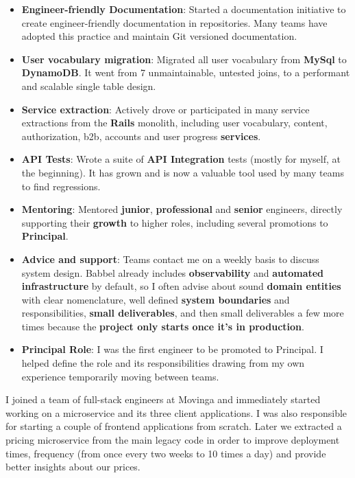 \documentclass[10pt,a4paper,ragged2e,withhyper]{altacv}
\begin{document}
\begin{paracol}{2}
{\begin{itemize}
\item \textbf{Engineer-friendly Documentation}: Started a documentation initiative to create engineer-friendly documentation in repositories. Many teams have adopted this practice and maintain Git versioned documentation.
\item \textbf{User vocabulary migration}: Migrated all user vocabulary from \textbf{MySql} to \textbf{DynamoDB}. It went from 7 unmaintainable, untested joins, to a performant and scalable single table design.
\item \textbf{Service extraction}: Actively drove or participated in many service extractions from the \textbf{Rails} monolith, including user vocabulary, content, authorization, b2b, accounts and user progress \textbf{services}.
\item \textbf{API Tests}: Wrote a suite of \textbf{API Integration} tests (mostly for myself, at the beginning). It has grown and is now a valuable tool used by many teams to find regressions.
\item \textbf{Mentoring}: Mentored \textbf{junior}, \textbf{professional} and \textbf{senior} engineers, directly supporting their \textbf{growth} to higher roles, including several promotions to \textbf{Principal}.
\item \textbf{Advice and support}: Teams contact me on a weekly basis to discuss system design. Babbel already includes \textbf{observability} and \textbf{automated infrastructure} by default, so I often advise about sound \textbf{domain entities} with clear nomenclature, well defined \textbf{system boundaries} and responsibilities, \textbf{small deliverables}, and then small deliverables a few more times because the \textbf{project only starts once it's in production}.
\item \textbf{Principal Role}: I was the first engineer to be promoted to Principal. I helped define the role and its responsibilities drawing from my own experience temporarily moving between teams.
\end{itemize}
}

\divider


{\RaggedRight
I joined a team of full-stack engineers at Movinga and immediately started working on a microservice and its three client applications. I was also responsible for starting a couple of frontend applications from scratch. Later we extracted a pricing microservice from the main legacy code in order to improve deployment times, frequency (from once every two weeks to 10 times a day) and provide better insights about our prices.

}
\end{paracol}
\end{document}
